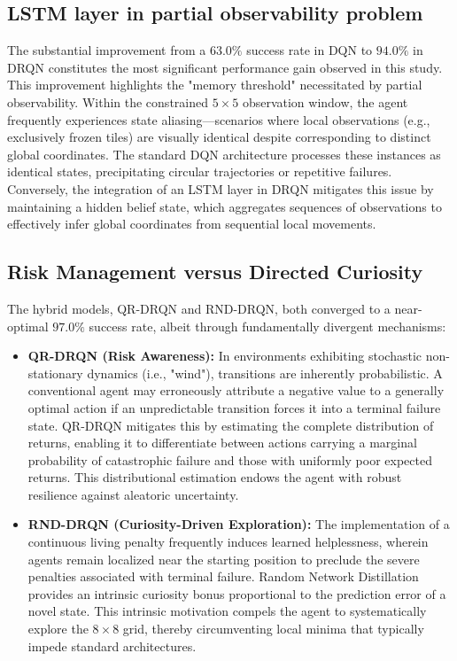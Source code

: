 \documentclass{article}
\begin{document}
\subsection{LSTM layer in partial observability problem}
The substantial improvement from a $63.0\%$ success rate in DQN to $94.0\%$ in DRQN constitutes the most significant performance gain observed in this study. This improvement highlights the "memory threshold" necessitated by partial observability. Within the constrained $5\times5$ observation window, the agent frequently experiences state aliasing—scenarios where local observations (e.g., exclusively frozen tiles) are visually identical despite corresponding to distinct global coordinates. The standard DQN architecture processes these instances as identical states, precipitating circular trajectories or repetitive failures. Conversely, the integration of an LSTM layer in DRQN mitigates this issue by maintaining a hidden belief state, which aggregates sequences of observations to effectively infer global coordinates from sequential local movements.

\subsection{Risk Management versus Directed Curiosity}
The hybrid models, QR-DRQN and RND-DRQN, both converged to a near-optimal $97.0\%$ success rate, albeit through fundamentally divergent mechanisms:
\begin{itemize}
    \item \textbf{QR-DRQN (Risk Awareness):} In environments exhibiting stochastic non-stationary dynamics (i.e., "wind"), transitions are inherently probabilistic. A conventional agent may erroneously attribute a negative value to a generally optimal action if an unpredictable transition forces it into a terminal failure state. QR-DRQN mitigates this by estimating the complete distribution of returns, enabling it to differentiate between actions carrying a marginal probability of catastrophic failure and those with uniformly poor expected returns. This distributional estimation endows the agent with robust resilience against aleatoric uncertainty.
    \item \textbf{RND-DRQN (Curiosity-Driven Exploration):} The implementation of a continuous living penalty frequently induces learned helplessness, wherein agents remain localized near the starting position to preclude the severe penalties associated with terminal failure. Random Network Distillation provides an intrinsic curiosity bonus proportional to the prediction error of a novel state. This intrinsic motivation compels the agent to systematically explore the $8\times8$ grid, thereby circumventing local minima that typically impede standard architectures.
\end{itemize}
\end{document}
